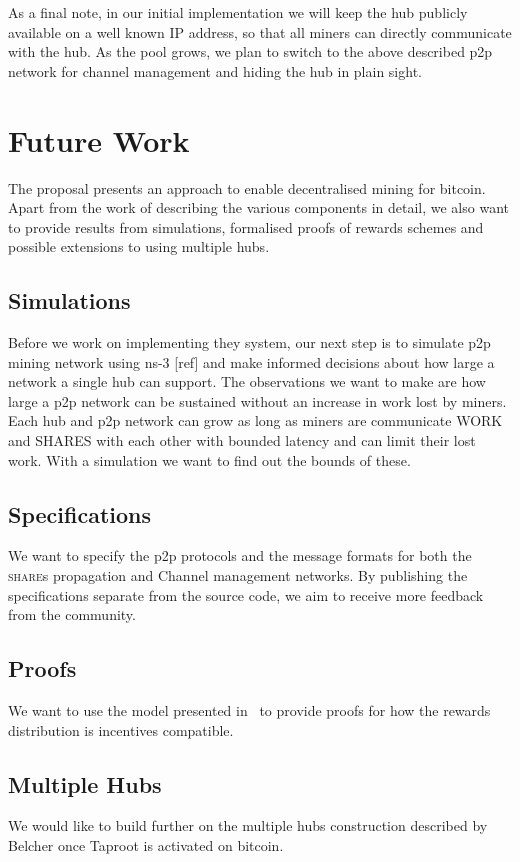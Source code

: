 \documentclass{article}
\begin{document}
As a final note, in our initial implementation we will keep the hub
publicly available on a well known IP address, so that all miners can
directly communicate with the hub. As the pool grows, we plan to
switch to the above described p2p network for channel management and
hiding the hub in plain sight.

\section{Future Work}

The proposal presents an approach to enable decentralised mining for
bitcoin. Apart from the work of describing the various components in
detail, we also want to provide results from simulations, formalised
proofs of rewards schemes and possible extensions to using multiple
hubs.

\subsection{Simulations}

Before we work on implementing they system, our next step is to
simulate p2p mining network using ns-3 [ref] and make informed
decisions about how large a network a single hub can support. The
observations we want to make are how large a p2p network can be
sustained without an increase in work lost by miners. Each hub and p2p
network can grow as long as miners are communicate WORK and SHARES
with each other with bounded latency and can limit their lost
work. With a simulation we want to find out the bounds of these.

\subsection{Specifications}

We want to specify the p2p protocols and the message formats for both
the \textsc{share}s propagation and Channel management networks. By
publishing the specifications separate from the source code, we aim to
receive more feedback from the community.

\subsection{Proofs}

We want to use the model presented in~\cite{incentives-compatible} to
provide proofs for how the rewards distribution is incentives
compatible.

\subsection{Multiple Hubs}

We would like to build further on the multiple hubs construction
described by Belcher once Taproot is activated on bitcoin.

 

\end{document}

